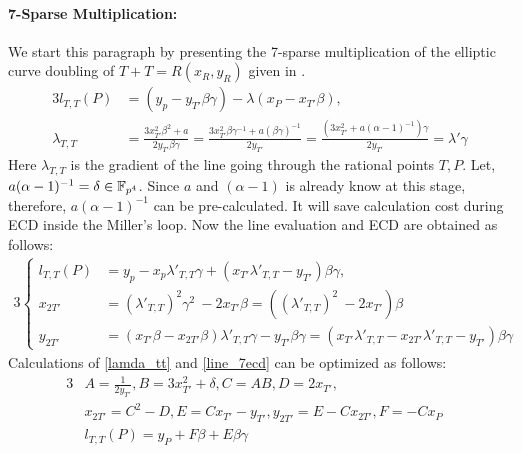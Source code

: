 \paragraph{\bf{7-Sparse Multiplication:}}
We start this paragraph by presenting the 7-sparse multiplication of the elliptic curve doubling of $T+T = R(x_R, y_R)$ given in \cite{EC:AKLGL11, SAC:GALHJ12}. 
\begin{alignat}{3}
l_{T,T}(P) &= (y_p-y_{T'} \beta\gamma)- \lambda(x_P-x_{T'}\beta),  \nonumber\\
\lambda_{T,T} &= \frac{ 3x_{T'}^2 \beta^2+a}{2 y_{T'} \beta \gamma } = \frac{ 3x_{T'}^2 \beta \gamma^{-1}+a (\beta \gamma)^{-1} }{2 y_{T'}}
= \frac{ (3x_{T'}^2 +a(\alpha-1)^{-1})\gamma}{2 y_{T'}} = \lambda' \gamma  \label{lamda_tt}
\end{alignat}
Here $\lambda_{T,T}$ is the gradient of the line going through the rational points $T, P$. 
Let, $a(\alpha-1)^{-1}= \delta \in \mathbb{F}_{p^4}$.
Since $a$ and $(\alpha-1)$ is already know at this stage, therefore, $a(\alpha-1)^{-1}$ can be pre-calculated.
It will save calculation cost during ECD inside the Miller's loop.
Now the line evaluation and ECD are obtained as follows:
\begin{alignat}{3}
\begin{cases}\label{line_7ecd}
l_{T,T}(P) &= y_p- x_p \lambda'_{T,T}\gamma + (x_{T'}\lambda'_{T,T}- y_{T'})\beta\gamma, \\
x_{2T'}& = (\lambda'_{T,T})^2 \gamma^2 \ - 2x_{T'}\beta   = ((\lambda'_{T,T})^2  \ - 2x_{T'})\beta  \\
y_{2T'} &= (x_{T'} \beta-x_{2T'} \beta)\lambda'_{T,T}\gamma-y_{T'}\beta\gamma  =(x_{T'}\lambda'_{T,T} -x_{2T'}\lambda'_{T,T}-y_{T'})\beta\gamma 
\end{cases}
\end{alignat}
Calculations of \eqref{lamda_tt} and \eqref{line_7ecd} can be optimized as follows:
\begin{alignat}{3}
&A                = \frac{1}{2y_{T'}}, B =3x_{T'}^2+\delta, C =AB, D=2x_{T'},&\nonumber\\
&x_{2T'}      = C^2-D,  E= Cx_{T'}-y_{T'}, y_{2T'}=E-Cx_{2T'}, F=-Cx_P &\nonumber\\
&l_{T,T}(P)   = y_P+F \beta +E\beta \gamma&   \label{cvma_kss16_sparse_dbl}
\end{alignat}

